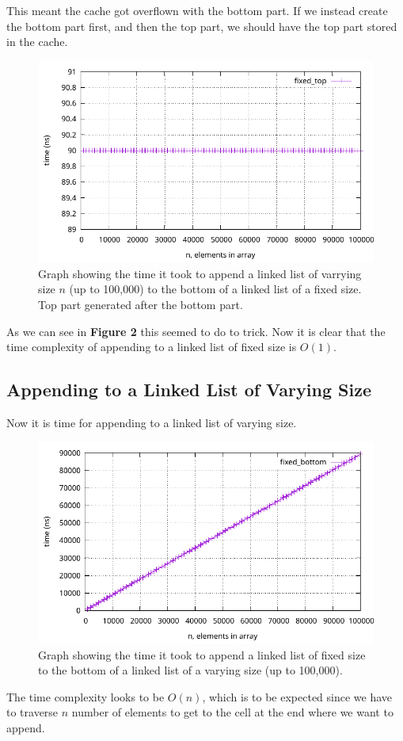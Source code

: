 \documentclass[a4paper, 11pt]{article}
\begin{document}
	This meant the cache got overflown with the bottom part.
	If we instead create the bottom part first, and then the top part, we should have the top part stored in the cache.
	\begin{figure}[H]
		\centering
		\includegraphics[scale=0.8]{graphs/fixed_top_gen_top_last.pdf}
		\caption{
			Graph showing the time it took to append a linked list of varrying size \(n\) (up to 100,000) to the bottom of a linked list of a fixed size.
			Top part generated after the bottom part.
		}
	\end{figure}
	As we can see in \textbf{Figure 2} this seemed to do to trick.
	Now it is clear that the time complexity of appending to a linked list of fixed size is \(O(1)\).

	\subsection{Appending to a Linked List of Varying Size}
	Now it is time for appending to a linked list of varying size.
	\begin{figure}[H]
		\centering
		\includegraphics[scale=0.8]{graphs/fixed_bottom.pdf}
		\caption{
			Graph showing the time it took to append a linked list of fixed size to the bottom of a linked list of a varying size (up to 100,000).
		}
	\end{figure}
	The time complexity looks to be \(O(n)\), which is to be expected since we have to traverse \(n\) number of elements to get to the cell at the end where we want to append.
\end{document}
